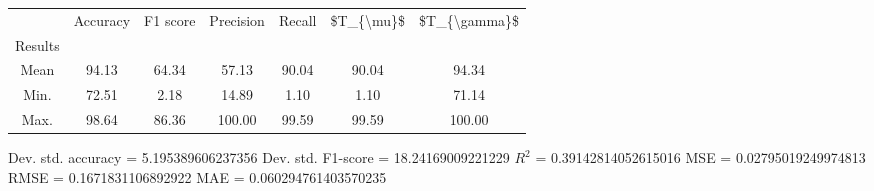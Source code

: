 \begin{tabular}{|c|c|c|c|c|c|c|}
\toprule
{} &  Accuracy &  F1 score &  Precision &  Recall &  \$T\_\{\textbackslash mu\}\$ &  \$T\_\{\textbackslash gamma\}\$ \\
Results &           &           &            &         &            &               \\
\hline
Mean    &     94.13 &     64.34 &      57.13 &   90.04 &      90.04 &         94.34 \\
Min.    &     72.51 &      2.18 &      14.89 &    1.10 &       1.10 &         71.14 \\
Max.    &     98.64 &     86.36 &     100.00 &   99.59 &      99.59 &        100.00 \\
\bottomrule
\end{tabular}

 Dev. std. accuracy = 5.195389606237356
 Dev. std. F1-score = 18.24169009221229
 $R^2$ = 0.39142814052615016
 MSE = 0.02795019249974813
 RMSE = 0.1671831106892922
 MAE = 0.060294761403570235